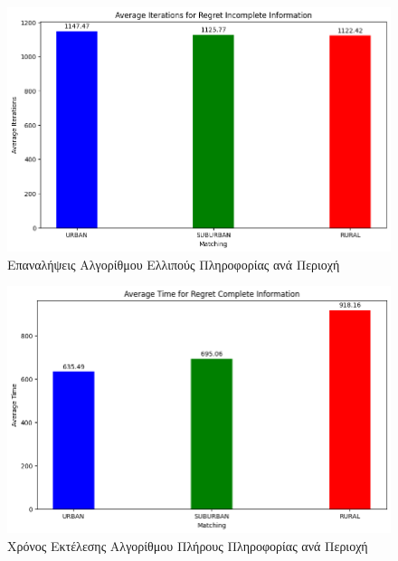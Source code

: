\begin{figure}[H]
    \centering
    \includegraphics[width=\textwidth]{figures/chapter4/Average_Iterations_per_area_RII.png}
    \caption{Επαναλήψεις Αλγορίθμου Ελλιπούς Πληροφορίας ανά Περιοχή}
    \label{fig42}
\end{figure}

\begin{figure}[H]
    \centering
    \includegraphics[width=\textwidth]{figures/chapter4/Average_Time_per_area_RCI.png}
    \caption{Χρόνος Εκτέλεσης Αλγορίθμου Πλήρους Πληροφορίας ανά Περιοχή}
    \label{fig43}
\end{figure}

